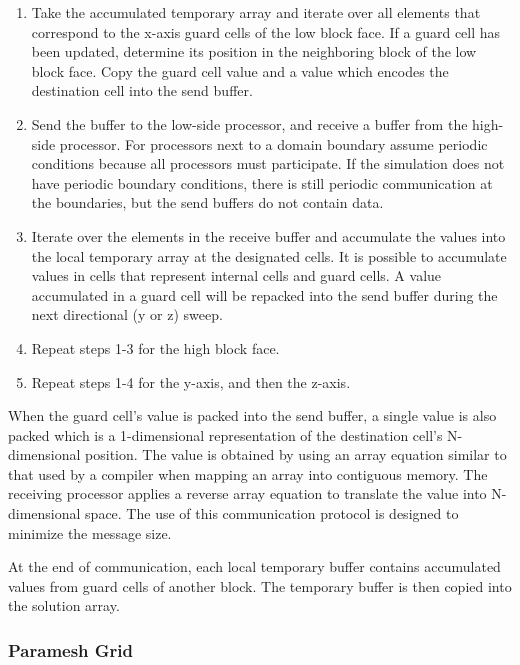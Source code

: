 \begin {enumerate}
\item Take the accumulated temporary array and iterate over all
  elements that correspond to the x-axis guard cells of the low block
  face.  If a guard cell has been updated, determine its position in
  the neighboring block of the low block face.  Copy the guard cell
  value and a value which encodes the destination cell into the send
  buffer.  %
\item Send the buffer to the low-side processor, and receive a buffer
  from the high-side processor.  For processors next to a domain
  boundary assume periodic conditions because all processors must
  participate.  If the simulation does not have periodic boundary
  conditions, there is still periodic communication at the boundaries,
  but the send buffers do not contain data.
\item Iterate over the elements in the receive buffer and accumulate
  the values into the local temporary array at the designated cells.
  It is possible to accumulate values in cells that represent internal
  cells and guard cells.  A value accumulated in a guard cell will be
  repacked into the send buffer during the next directional (y or z)
  sweep.
\item Repeat steps 1-3 for the high block face.
\item Repeat steps 1-4 for the y-axis, and then the z-axis.
\end {enumerate}

When the guard cell's value is packed into the send buffer, a single
value is also packed which is a 1-dimensional representation of the
destination cell's N-dimensional position.  The value is obtained by using an
array equation similar to that used by a compiler when mapping an
array into contiguous memory.  The receiving processor applies a
reverse array equation to translate the value into N-dimensional
space.  The use of this communication protocol is designed to minimize
the message size.

At the end of communication, each local temporary buffer contains
accumulated values from guard cells of another block.  The temporary
buffer is then copied into the solution array.



\subsubsection{Paramesh Grid}
\label{Sec:ParameshGridParticleMap}

